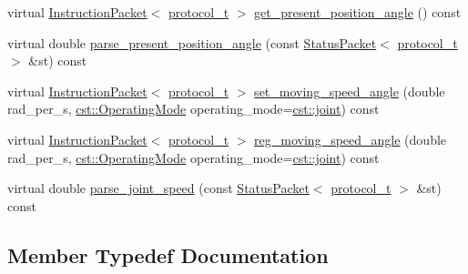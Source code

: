 \begin{DoxyCompactItemize}
virtual \hyperlink{classdynamixel_1_1_instruction_packet}{Instruction\+Packet}$<$ \hyperlink{classdynamixel_1_1servos_1_1_base_servo_ac484c11279ee2576a9a3bb8c940e0baf}{protocol\+\_\+t} $>$ \hyperlink{classdynamixel_1_1servos_1_1_base_servo_a26a0ccb64fcefde496e1f45ed6462125}{get\+\_\+present\+\_\+position\+\_\+angle} () const 
\item 
virtual double \hyperlink{classdynamixel_1_1servos_1_1_base_servo_a235479ae2b41314f2d5f9492a1b09b44}{parse\+\_\+present\+\_\+position\+\_\+angle} (const \hyperlink{classdynamixel_1_1_status_packet}{Status\+Packet}$<$ \hyperlink{classdynamixel_1_1servos_1_1_base_servo_ac484c11279ee2576a9a3bb8c940e0baf}{protocol\+\_\+t} $>$ \&st) const 
\item 
virtual \hyperlink{classdynamixel_1_1_instruction_packet}{Instruction\+Packet}$<$ \hyperlink{classdynamixel_1_1servos_1_1_base_servo_ac484c11279ee2576a9a3bb8c940e0baf}{protocol\+\_\+t} $>$ \hyperlink{classdynamixel_1_1servos_1_1_base_servo_a5a976fa54ae637537b03596befcb7529}{set\+\_\+moving\+\_\+speed\+\_\+angle} (double rad\+\_\+per\+\_\+s, \hyperlink{namespacedynamixel_1_1servos_1_1cst_ac17b5608f65c6495114d34f8efc4d809}{cst\+::\+Operating\+Mode} operating\+\_\+mode=\hyperlink{namespacedynamixel_1_1servos_1_1cst_ac17b5608f65c6495114d34f8efc4d809a1fdfcfad31f04d24b25c0842e9d99c48}{cst\+::joint}) const 
\item 
virtual \hyperlink{classdynamixel_1_1_instruction_packet}{Instruction\+Packet}$<$ \hyperlink{classdynamixel_1_1servos_1_1_base_servo_ac484c11279ee2576a9a3bb8c940e0baf}{protocol\+\_\+t} $>$ \hyperlink{classdynamixel_1_1servos_1_1_base_servo_a2b9b43a25ff078a54031f58e752a177e}{reg\+\_\+moving\+\_\+speed\+\_\+angle} (double rad\+\_\+per\+\_\+s, \hyperlink{namespacedynamixel_1_1servos_1_1cst_ac17b5608f65c6495114d34f8efc4d809}{cst\+::\+Operating\+Mode} operating\+\_\+mode=\hyperlink{namespacedynamixel_1_1servos_1_1cst_ac17b5608f65c6495114d34f8efc4d809a1fdfcfad31f04d24b25c0842e9d99c48}{cst\+::joint}) const 
\item 
virtual double \hyperlink{classdynamixel_1_1servos_1_1_base_servo_a1fec786a4f11bd3febc4c6122e33cab5}{parse\+\_\+joint\+\_\+speed} (const \hyperlink{classdynamixel_1_1_status_packet}{Status\+Packet}$<$ \hyperlink{classdynamixel_1_1servos_1_1_base_servo_ac484c11279ee2576a9a3bb8c940e0baf}{protocol\+\_\+t} $>$ \&st) const 
\end{DoxyCompactItemize}


\subsection{Member Typedef Documentation}
\hypertarget{classdynamixel_1_1servos_1_1_base_servo_ac484c11279ee2576a9a3bb8c940e0baf}{}
